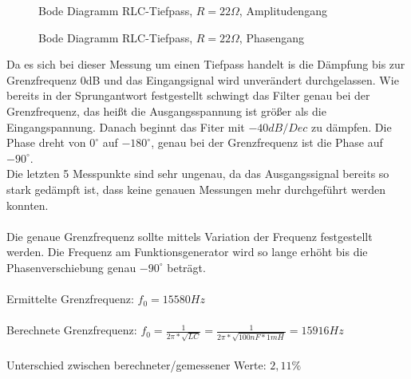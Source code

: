 \begin{figure}[H]
  \centering
  \caption{Bode Diagramm RLC-Tiefpass, $R=22\Omega$, Amplitudengang}
\end{figure}
\begin{figure}[H]
  \centering
  \caption{Bode Diagramm RLC-Tiefpass, $R=22\Omega$, Phasengang}
\end{figure}
\noindent
Da es sich bei dieser Messung um einen Tiefpass handelt is die D\"ampfung bis zur Grenzfrequenz 0dB und das Eingangsignal wird unver\"andert durchgelassen. Wie bereits in der Sprungantwort festgestellt schwingt das Filter genau bei der Grenzfrequenz, das heißt die Ausgangsspannung ist gr\"o\ss{}er als die Eingangspannung. Danach beginnt das Fiter mit $-40dB/Dec$ zu d\"ampfen. Die Phase dreht von $0^\circ$ auf $-180^\circ$, genau bei der Grenzfrequenz ist die Phase auf $-90^\circ$. \\
Die letzten 5 Messpunkte sind sehr ungenau, da das Ausgangssignal bereits so stark ged\"ampft ist, dass keine genauen Messungen mehr durchgef\"uhrt werden konnten. \\ \\
Die genaue Grenzfrequenz sollte mittels Variation der Frequenz festgestellt werden. Die Frequenz am Funktionsgenerator wird so lange erh\"oht bis die Phasenverschiebung genau $-90^\circ$ betr\"agt. \\ \\
Ermittelte Grenzfrequenz: $f_0=15580Hz$ \\ \\
Berechnete Grenzfrequenz: $f_0=\frac{1}{2\pi * \sqrt{LC}}=\frac{1}{2\pi * \sqrt{100nF*1mH}} = 15916Hz$ \\ \\
Unterschied zwischen berechneter/gemessener Werte: $2,11\%$


